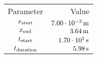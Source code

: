 \begin{tabular}{cr}
    \toprule
    Parameter & Value \\ \otoprule
    $x_{\textup{start}}$    & $\unit[7.00 \cdot 10^{-3}]{m}$ \\
    $x_{\textup{end}}$      & $\unit[3.64]{m}$ \\
    $t_{\textup{start}}$    & $\unit[1.70 \cdot 10^{1}]{s}$ \\
    $t_{\textup{duration}}$ & $\unit[5.98]{s}$ \\
    \bottomrule
\end{tabular}
